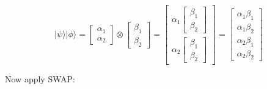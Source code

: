 \documentclass[main.tex]{subfiles}
\begin{document}
    $$
    |\psi\rangle|\phi\rangle=\left[\begin{array}{l}
    \alpha_{1} \\
    \alpha_{2}
    \end{array}\right] \otimes\left[\begin{array}{l}
    \beta_{1} \\
    \beta_{2}
    \end{array}\right]=\left[\begin{array}{c}
    \alpha_{1}\left[\begin{array}{l}
    \beta_{1} \\
    \beta_{2}
    \end{array}\right] \\
    \alpha_{2}\left[\begin{array}{l}
    \beta_{1} \\
    \beta_{2}
    \end{array}\right]
    \end{array}\right]=\left[\begin{array}{c}
    \alpha_{1} \beta_{1} \\
    \alpha_{1} \beta_{2} \\
    \alpha_{2} \beta_{1} \\
    \alpha_{2} \beta_{2}
    \end{array}\right]
    $$
    
    Now apply SWAP:
    
\end{document}
